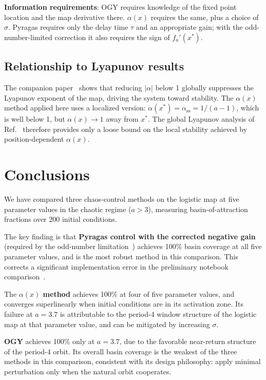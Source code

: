 \documentclass[aps,pre,twocolumn,superscriptaddress,nofootinbib,
               longbibliography,floatfix]{revtex4-2}
\newcommand{\xstar}{x^*}
\begin{document}
\textbf{Information requirements}: OGY requires knowledge of
the fixed point location and the map derivative there.
$\alpha(x)$ requires the same, plus a choice of $\sigma$.
Pyragas requires only the delay time $\tau$ and an appropriate
gain; with the odd-number-limited correction it also requires
the sign of $f_a'(\xstar)$.

\subsection{Relationship to Lyapunov results}

The companion paper~\cite{Z2Paper} shows that reducing
$|\alpha|$ below 1 globally suppresses the Lyapunov exponent
of the map, driving the system toward stability.
The $\alpha(x)$ method applied here uses a localized version:
$\alpha(\xstar) = \alpha_{\mathrm{ss}} = 1/(a-1)$, which is
well below 1, but $\alpha(x) \to 1$ away from $\xstar$.
The global Lyapunov analysis of Ref.~\cite{Z2Paper} therefore
provides only a loose bound on the local stability achieved
by position-dependent $\alpha(x)$.

\section{Conclusions}
\label{sec:conclusions}

We have compared three chaos-control methods on the logistic
map at five parameter values in the chaotic regime ($a > 3$),
measuring basin-of-attraction fractions over 200 initial
conditions.

The key finding is that \textbf{Pyragas control with the
corrected negative gain} (required by the odd-number
limitation~\cite{Nakajima1997}) achieves 100\% basin coverage
at all five parameter values, and is the most robust method
in this comparison.
This corrects a significant implementation error in the
preliminary notebook comparison~\cite{PetrificationRepo}.

The \textbf{$\alpha(x)$ method} achieves 100\% at four of five
parameter values, and converges superlinearly when initial
conditions are in its activation zone.
Its failure at $a = 3.7$ is attributable to the period-4
window structure of the logistic map at that parameter value,
and can be mitigated by increasing $\sigma$.

\textbf{OGY} achieves 100\% only at $a = 3.7$, due to the
favorable near-return structure of the period-4 orbit.
Its overall basin coverage is the weakest of the three
methods in this comparison, consistent with its design
philosophy: apply minimal perturbation only when the natural
orbit cooperates.
\end{document}
